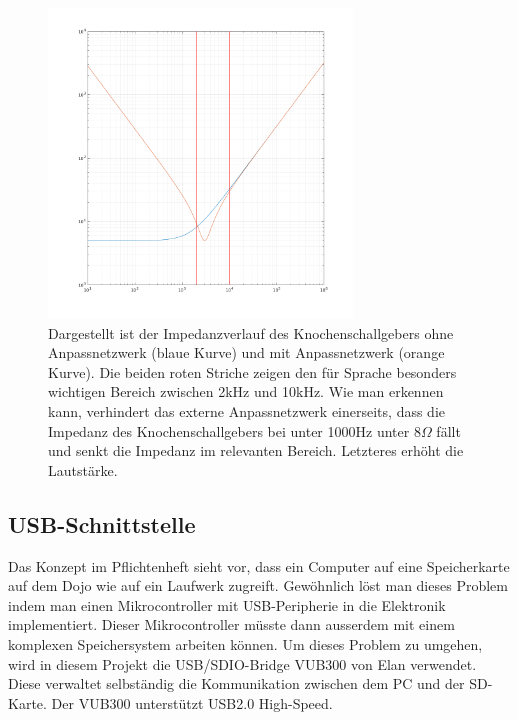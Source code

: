   \begin{figure}[h]
	\centering
	\includegraphics[width=0.72\textwidth]{graphics/RLGlied.png}
	\caption{Dargestellt ist der Impedanzverlauf des Knochenschallgebers ohne Anpassnetzwerk (blaue Kurve) und mit Anpassnetzwerk (orange Kurve). Die beiden roten Striche zeigen den für Sprache besonders wichtigen Bereich zwischen 2kHz und 10kHz.
	Wie man erkennen kann, verhindert das externe Anpassnetzwerk einerseits, dass die Impedanz des Knochenschallgebers bei unter 1000Hz unter 8\(\Omega\) fällt und senkt die Impedanz im relevanten Bereich. Letzteres erhöht die Lautstärke.}
	\label{fig:Impedanz_Knochenschall_modell}
  \end{figure}
  
  



\subsection{USB-Schnittstelle}\label{sec:USB}
Das Konzept im Pflichtenheft sieht vor, dass ein Computer auf eine Speicherkarte auf dem Dojo wie auf ein Laufwerk zugreift. Gewöhnlich löst man dieses Problem indem man einen Mikrocontroller mit USB-Peripherie in die Elektronik implementiert.
Dieser Mikrocontroller müsste dann ausserdem mit einem komplexen Speichersystem arbeiten können. Um dieses Problem zu umgehen, wird in diesem Projekt die USB/SDIO-Bridge VUB300 von Elan verwendet. Diese verwaltet selbständig die Kommunikation zwischen dem PC und der SD-Karte.
Der VUB300 unterstützt USB2.0 High-Speed. 

\vspace{0.2cm}


